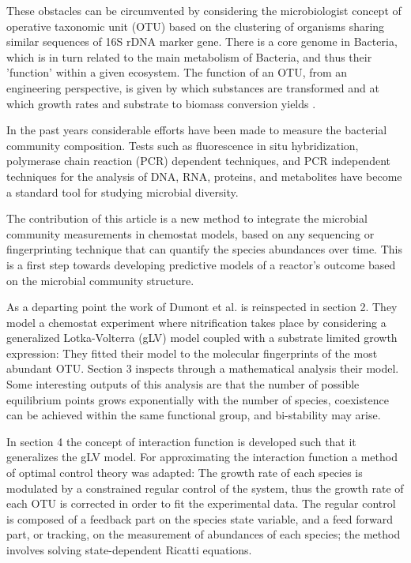 \documentclass[3p,times]{article}
\begin{document}
These obstacles can be circumvented by considering the microbiologist concept of operative taxonomic unit (OTU) based on the clustering of organisms sharing similar sequences of 16S rDNA marker gene. There is a core genome in Bacteria, which is in turn related to the main metabolism of Bacteria, and thus their 'function' within a given ecosystem. The function of an OTU, from an engineering perspective, is given by which substances are transformed and at which growth rates and substrate to biomass conversion yields \cite{Muyzer1993}.

In the past years considerable efforts have been made to measure the bacterial community composition. Tests such as fluorescence in situ hybridization, polymerase chain reaction (PCR) dependent techniques, and PCR independent techniques for the analysis of DNA, RNA, proteins, and metabolites have become a standard tool for studying  microbial diversity\cite{FERRERA2016790}. 

The contribution of this article is a new method to integrate the microbial community measurements in chemostat models, based on any sequencing or fingerprinting technique that can quantify the species abundances over time. This is a first step towards developing predictive models of a reactor's outcome based on the microbial community structure.

As a departing point the work of Dumont et al.\cite{Dumont2016} is reinspected in section 2. They model a chemostat experiment where nitrification takes place by considering a generalized Lotka-Volterra (gLV) model \cite{Hernandez-Bermejo1997} coupled with a substrate limited growth expression: They fitted their model to the molecular fingerprints of the most abundant OTU. Section 3 inspects through a mathematical analysis their model. Some interesting outputs of this analysis are that the number of possible equilibrium points grows exponentially with the number of species,  coexistence can be achieved within the same functional group, and bi-stability may arise.  

In section 4 the concept of interaction function is developed such that it generalizes the gLV model. For approximating the interaction function a method of optimal control theory was adapted: The growth rate of each species is modulated by a constrained regular control of the system, thus the growth rate of each OTU is corrected in order to fit the experimental data. The regular control is composed of a feedback part on the species state variable, and a feed forward part, or tracking, on the measurement of abundances of each species; the method involves solving state-dependent Ricatti equations\cite{Cimen2008}. 
\end{document}
